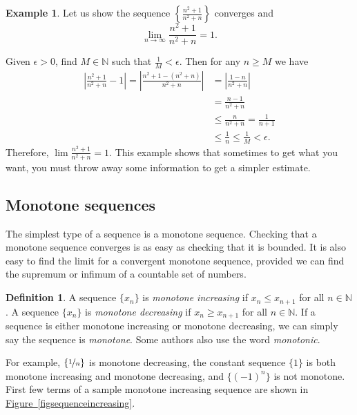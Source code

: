 \documentclass[12pt]{book}
\newcommand{\abs}[1]{\left\lvert {#1} \right\rvert}
\newcommand{\N}{{\mathbb{N}}}
\theoremstyle{plain}
\theoremstyle{remark}
\theoremstyle{definition}
\newtheorem{defn}[thm]{Definition}
\theoremstyle{exercise}
\theoremstyle{example}
\newtheorem{example}[thm]{Example}
\newcommand{\figureref}[1]{\hyperref[#1]{Figure~\ref*{#1}}}
\begin{document}
\begin{example}
Let us show the sequence $\left\{ \frac{n^2+1}{n^2+n} \right\}$ converges and
\begin{equation*}
\lim_{n\to\infty} \frac{n^2+1}{n^2+n} = 1 .
\end{equation*}

Given $\epsilon > 0$,
find $M \in \N$ such that $\frac{1}{M} < \epsilon$.  Then for any $n \geq
M$ we have
\begin{equation*}
\begin{split}
\abs{\frac{n^2+1}{n^2+n} - 1}  =
\abs{\frac{n^2+1 - (n^2+n)}{n^2+n}}
& =
\abs{\frac{1 - n}{n^2+n}} \\
& =
\frac{n-1}{n^2+n} \\
& \leq 
\frac{n}{n^2+n} 
 =
\frac{1}{n+1}  \\
& \leq \frac{1}{n}
\leq \frac{1}{M} < \epsilon .
\end{split}
\end{equation*}
Therefore,
$\lim \frac{n^2+1}{n^2+n} = 1$.
This example shows that sometimes to get what you want, you must throw away
some information to get a simpler estimate.
\end{example}

\subsection{Monotone sequences}

The simplest type of a sequence is a monotone sequence.  Checking that
a monotone sequence converges is as easy as checking that it is bounded.
It is also easy to find
the limit for a convergent
monotone sequence, provided we can find the supremum or infimum
of a countable set of numbers.

\begin{defn}
A sequence $\{ x_n \}$ is \emph{monotone increasing} if $x_n \leq x_{n+1}$ for all $n \in \N$.  
%
A sequence $\{ x_n \}$ is \emph{monotone decreasing} if $x_n \geq x_{n+1}$ for all $n \in \N$.  
%
If a sequence is either monotone increasing or monotone decreasing, we
can simply say the sequence is \emph{monotone}.  Some
authors also use the word \emph{monotonic}.
\end{defn}

For example, $\{ \nicefrac{1}{n} \}$ is monotone decreasing,
the constant sequence $\{ 1 \}$ is both monotone increasing and monotone
decreasing, and $\{ {(-1)}^n \}$ is not monotone.
First few terms of a sample monotone increasing sequence
are shown in 
\figureref{figsequenceincreasing}.
\end{document}
